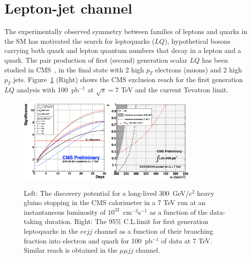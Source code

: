 \documentclass{PoS}
\begin{document}
\section{Lepton-jet channel} \label{leptonjet}
The experimentally observed symmetry between families of  
leptons and quarks in the SM has motivated the search for leptoquarks ($LQ$), 
hypothetical bosons carrying both quark and lepton quantum numbers 
that decay in a lepton and a quark.
The pair production of first (second) generation scalar $LQ$ has been studied in CMS~\cite{LQPAS}, 
in the final state with 2 high $p_T$ electrons (muons) and 2 high $p_T$ jets. 
Figure~\ref{fig:StoppedHadron_LQ} (Right) shows the CMS exclusion reach for the first generation $LQ$ analysis 
with 100~pb$^{-1}$ at $\sqrt{s} = 7$ TeV and the current Tevatron limit.

\begin{figure}[htbp] 
\centering
\includegraphics[width=0.4\textwidth]{SG1.eps}\includegraphics[width=0.4\textwidth]{LQ1.eps}  
\caption{Left: The discovery potential for a long-lived 300~GeV/$c^2$ heavy gluino stopping in the CMS calorimeter 
in a 7 TeV run at an instantaneous luminosity of $10^{32}$~cm$^{-2}$s$^{-1}$ as a function of the data-taking 
duration. Right: The 95\% C.L.limit for first generation leptoquarks in the $ee jj$ channel as 
a function of their branching fraction into electron and quark for 100~pb$^{-1}$ of data at 7 TeV.
Similar reach is obtained in the $\mu\mu jj$ channel.}
\label{fig:StoppedHadron_LQ}
\end{figure}
\end{document}
